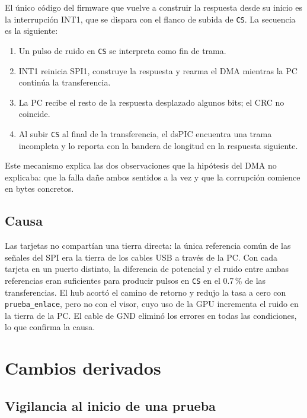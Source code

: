 \documentclass[11pt]{article}
\newcommand{\code}[1]{\texttt{#1}}
\begin{document}
El único código del firmware que vuelve a construir la respuesta desde su
inicio es la interrupción INT1, que se dispara con el flanco de subida de
\code{CS}. La secuencia es la siguiente:

\begin{enumerate}
\item Un pulso de ruido en \code{CS} se interpreta como fin de trama.
\item INT1 reinicia SPI1, construye la respuesta y rearma el DMA mientras la
  PC continúa la transferencia.
\item La PC recibe el resto de la respuesta desplazado algunos bits; el CRC
  no coincide.
\item Al subir \code{CS} al final de la transferencia, el dsPIC encuentra una
  trama incompleta y lo reporta con la bandera de longitud en la respuesta
  siguiente.
\end{enumerate}

Este mecanismo explica las dos observaciones que la hipótesis del DMA no
explicaba: que la falla dañe ambos sentidos a la vez y que la corrupción
comience en bytes concretos.

\subsection{Causa}

Las tarjetas no compartían una tierra directa: la única referencia común de
las señales del SPI era la tierra de los cables USB a través de la PC. Con
cada tarjeta en un puerto distinto, la diferencia de potencial y el ruido
entre ambas referencias eran suficientes para producir pulsos en \code{CS}
en el 0.7\,\% de las transferencias. El hub acortó el camino de retorno y
redujo la tasa a cero con \code{prueba\_enlace}, pero no con el visor, cuyo
uso de la GPU incrementa el ruido en la tierra de la PC. El cable de GND
eliminó los errores en todas las condiciones, lo que confirma la causa.

\section{Cambios derivados}

\subsection{Vigilancia al inicio de una prueba}
\end{document}
